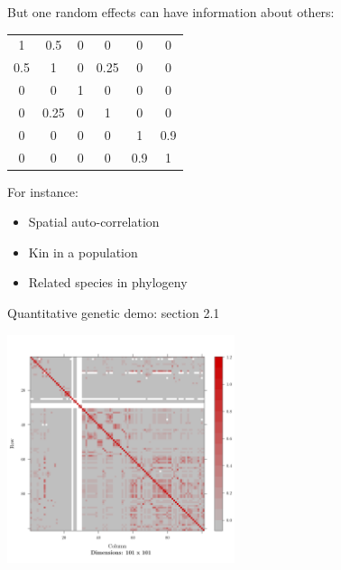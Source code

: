 \documentclass{beamer}
\begin{document}
\begin{frame}{But one random effects can have information about others:}

\begin{center}
 \begin{tabular}[t]{cccccc}
1 & 0.5 & 0 & 0 & 0 & 0\\
0.5 & 1 & 0 & 0.25 & 0 & 0\\
0 & 0 & 1 & 0 & 0 & 0\\
0 & 0.25 & 0 & 1 & 0 & 0\\
0 & 0 & 0 & 0 & 1 & 0.9\\
0 & 0 & 0 & 0 & 0.9 & 1
 \end{tabular}
 \end{center}

 \begin{exampleblock}{For instance:}
    \begin{itemize}
     \item Spatial auto-correlation
     \item Kin in a population
     \item Related species in phylogeny
    \end{itemize}
 \end{exampleblock}

\end{frame}

\begin{frame}{Quantitative genetic demo: section 2.1}
    \begin{center}
        \includegraphics[width=0.5\textwidth]{figure/Gmatrix-1}
    \end{center}    
\end{frame}
\end{document}
